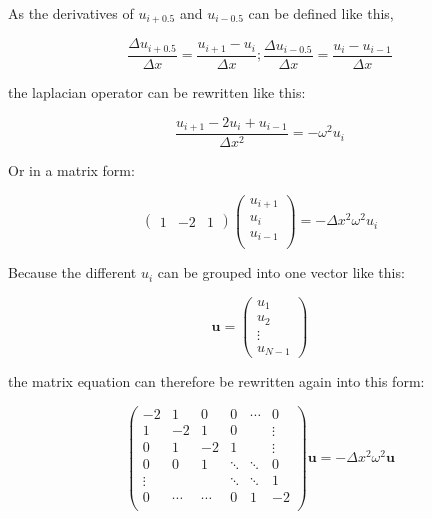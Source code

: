 As the derivatives of $u_{i+0.5}$ and $u_{i-0.5}$ can be defined like this,

\begin{equation}
\frac{\Delta u_{i+0.5}}{\Delta x} = \frac{u_{i+1}-u_i}{\Delta x}; \frac{\Delta u_{i-0.5}}{\Delta x} = \frac{u_i-u_{i-1}}{\Delta x}
\end{equation}

the laplacian operator can be rewritten like this:

\begin{equation}
    \frac{u_{i+1}-2u_{i}+u_{i-1}}{\Delta x^2} = -\omega^2 u_i \label{eq:dlaplacian}
\end{equation}

Or in a matrix form:

\begin{equation}
    \begin{pmatrix}
        1&-2&1
    \end{pmatrix}
    \begin{pmatrix}
        u_{i+1}\\
        u_i\\
        u_{i-1}\\
    \end{pmatrix}
    = -\Delta x^2 \omega^2 u_i
\end{equation}

Because the different $u_i$ can be grouped into one vector like this:

\begin{equation}
    \mathbf{u} = 
\begin{pmatrix}
    u_1\\
    u_2\\
    \vdots\\
    u_{N-1}
\end{pmatrix}
\end{equation}

the matrix equation can therefore be rewritten again into this form:

\begin{equation}
\begin{pmatrix}
    -2    &     1&     0&     0&\cdots&      0\\
    1     &    -2&     1&     0&      & \vdots\\
    0     &     1&    -2&     1&      & \vdots\\
    0     &     0&     1&\ddots&\ddots&      0\\
    \vdots&      &      &\ddots&\ddots&      1\\
    0     &\cdots&\cdots&     0&     1&     -2\\
\end{pmatrix}
\mathbf{u} = -\Delta x^2 \omega^2 \mathbf{u}
\end{equation}

